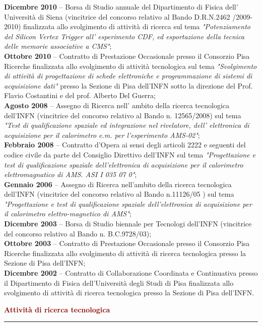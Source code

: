 \documentclass[10pt]{article}
\newcommand{\makeheadingNew}%
        {\hspace*{-\marginparsep minus \marginparwidth}%
         \begin{minipage}[t]{\textwidth+\marginparwidth+\marginparsep}%
                \textcolor{darkred}{\huge \bfseries Attivit\`a di ricerca tecnologica}\\[-0.15\baselineskip]%
                 \rule{\columnwidth}{1pt}%
        \end{minipage}}
\newcommand{\cvline}[2]{\textbf{#1} -- #2\\}
\begin{document}
\cvline{Dicembre 2010}{Borsa di Studio annuale del Dipartimento di Fisica dell' Universit\`a di Siena (vincitrice del concorso relativo al Bando D.R.N.2462 /2009-2010) finalizzata allo svolgimento di attivit\`a di ricerca sul tema \emph{"Potenziamento del Silicon Vertex Trigger all' esperimento CDF, ed esportazione della tecnica delle memorie associative a CMS"};}

\cvline{Ottobre 2010}{Contratto di Prestazione Occasionale presso il Consorzio Pisa Ricerche finalizzata allo svolgimento di attivit\`a tecnologica sul tema \emph{"Svolgimento di attivit\`a di progettazione di schede elettroniche e programmazione di sistemi di acquisizione dati"} presso la Sezione di Pisa dell'INFN sotto la direzione del Prof. Flavio Costantini e del prof. Alberto Del Guerra;}

\cvline{Agosto 2008}{Assegno di Ricerca nell' ambito della ricerca tecnologica dell'INFN (vincitrice del concorso relativo al Bando n. 12565/2008) sul tema \emph{"Test di qualificazione spaziale ed integrazione nel rivelatore, dell' elettronica di acquisizione per il calorimetro e.m. per l'esperimento AMS-02"};}

\cvline{Febbraio 2008}{Contratto d'Opera ai sensi degli articoli 2222 e seguenti del codice civile da parte del Consiglio Direttivo dell'INFN sul tema \emph{"Progettazione e test di qualificazione spaziale dell'elettronica di acquisizione per il calorimetro elettromagnatico di AMS. ASI I 035 07 0"};}


\cvline{Gennaio 2006}{Assegno di Ricerca nell'ambito della ricerca tecnologica dell'INFN (vincitrice del concorso relativo al Bando n.11126/05 ) sul tema \emph{"Progettazione e test di qualificazione spaziale dell'elettronica di acquisizione per il calorimetro elettro-magnetico di AMS"};}

\cvline{Dicembre 2003}{Borsa di Studio biennale per Tecnologi dell'INFN (vincitrice del concorso relativo al Bando n. B.C.9728/03);}

\cvline{Ottobre 2003}{Contratto di Prestazione Occasionale presso il Consorzio Pisa Ricerche finalizzata allo svolgimento di attivit\`a di ricerca tecnologica presso la Sezione di Pisa dell'INFN;}

\cvline{Dicembre 2002}{Contratto di Collaborazione Coordinata e Continuativa presso il Dipartimento di Fisica dell'Universit\`a degli Studi di Pisa finalizzata allo svolgimento di attivit\`a di ricerca tecnologica presso la Sezione di Pisa dell'INFN.}

\bigskip
\begin{minipage}{0.65\textwidth}
\begingroup
\let\center\flushleft
\let\endcenter\endflushleft
\makeheadingNew{}
\endgroup
\end{minipage}
\end{document}
